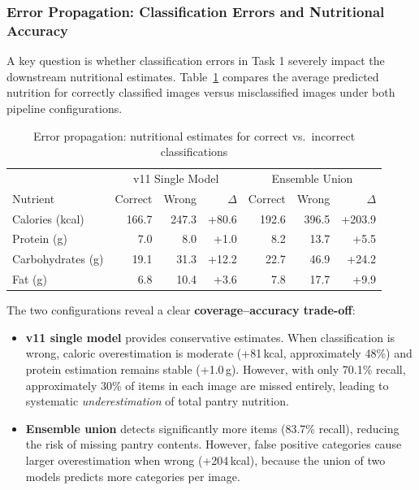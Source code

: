 \subsubsection{Error Propagation: Classification Errors and Nutritional Accuracy}

A key question is whether classification errors in Task 1 severely impact the downstream nutritional estimates. Table~\ref{tab:error_prop} compares the average predicted nutrition for correctly classified images versus misclassified images under both pipeline configurations.

\begin{table}[h]
\centering
\caption{Error propagation: nutritional estimates for correct vs.\ incorrect classifications}
\label{tab:error_prop}
\begin{tabular}{lrrr|rrr}
\toprule
 & \multicolumn{3}{c|}{v11 Single Model} & \multicolumn{3}{c}{Ensemble Union} \\
Nutrient & Correct & Wrong & $\Delta$ & Correct & Wrong & $\Delta$ \\
\midrule
Calories (kcal) & 166.7 & 247.3 & +80.6 & 192.6 & 396.5 & +203.9 \\
Protein (g) & 7.0 & 8.0 & +1.0 & 8.2 & 13.7 & +5.5 \\
Carbohydrates (g) & 19.1 & 31.3 & +12.2 & 22.7 & 46.9 & +24.2 \\
Fat (g) & 6.8 & 10.4 & +3.6 & 7.8 & 17.7 & +9.9 \\
\bottomrule
\end{tabular}
\end{table}

The two configurations reveal a clear \textbf{coverage--accuracy trade-off}:

\begin{itemize}[nosep,leftmargin=1.5em]
  \item \textbf{v11 single model} provides conservative estimates. When classification is wrong, caloric overestimation is moderate (+81\,kcal, approximately 48\%) and protein estimation remains stable (+1.0\,g). However, with only 70.1\% recall, approximately 30\% of items in each image are missed entirely, leading to systematic \textit{underestimation} of total pantry nutrition.
  \item \textbf{Ensemble union} detects significantly more items (83.7\% recall), reducing the risk of missing pantry contents. However, false positive categories cause larger overestimation when wrong (+204\,kcal), because the union of two models predicts more categories per image.
\end{itemize}

